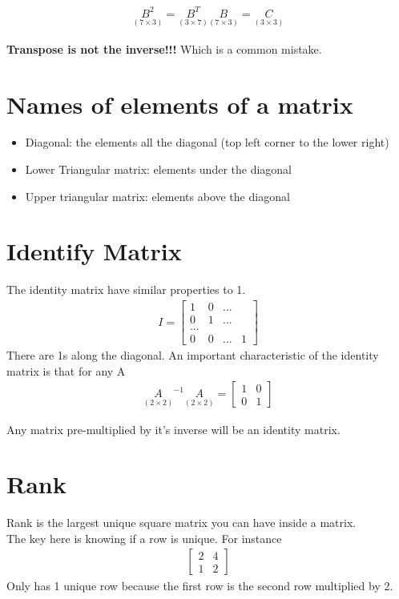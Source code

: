 \documentclass{article}
\begin{document}
\begin{align}
    \underset{(7 \times 3)}{B^2} = \underset{(3 \times 7)}{B^T} \underset{(7 \times 3)}{B} = \underset{ (3 \times 3)}{C}
\end{align}

\textbf{Transpose is not the inverse!!! } Which is a common mistake. 


\section{Names of elements of a matrix}
\begin{itemize}
    \item Diagonal: the elements all the diagonal (top left corner to the lower right)
    \item Lower Triangular matrix: elements under the diagonal 
    \item Upper triangular matrix: elements above the diagonal
\end{itemize}


\section{Identify Matrix}

The identity matrix have similar properties to 1. 
\begin{align}
    I = \begin{bmatrix}
        1 & 0 &  ... \\
        0 & 1 & ... \\
        ... & \\
        0 & 0 & ... & 1
    \end{bmatrix}
\end{align}
There are 1s along the diagonal. An important characteristic of the identity matrix is that for any A
\begin{align}
    \underset{(2 \times 2)} A^{-1}  \underset{(2 \times 2)} A = \begin{bmatrix}
                    1 & 0 \\
                    0 & 1
                \end{bmatrix}
\end{align}

Any matrix pre-multiplied by it's inverse will be an identity matrix. 

\section{Rank}
Rank is the largest unique square matrix you can have inside a matrix.\\

The key here is knowing if a row is unique.  For instance 
\begin{align}
    \begin{bmatrix}
        2 & 4 \\
        1 & 2
    \end{bmatrix}
\end{align}
Only has 1 unique row because the first row is the second row multiplied by 2. 
\end{document}
